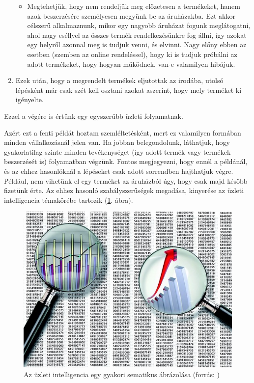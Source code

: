 \begin{enumerate}
\begin{itemize}
\item Megtehetjük, hogy nem rendeljük meg előzetesen a termékeket, hanem azok beszerzésére személyesen megyünk be az áruházakba. Ezt akkor célszerű alkalmaznunk, mikor egy nagyobb áruházat fogunk meglátogatni, ahol nagy eséllyel az összes termék rendelkezésünkre fog állni, így azokat egy helyről azonnal meg is tudjuk venni, és elvinni. Nagy előny ebben az esetben (szemben az online rendeléssel), hogy ki is tudjuk próbálni az adott termékeket, hogy hogyan működnek, van-e valamilyen hibájuk.
\end{itemize}

\item Ezek után, hogy a megrendelt termékek eljutottak az irodába, utolsó lépésként már csak szét kell osztani azokat aszerint, hogy mely terméket ki igényelte.
\end{enumerate}
Ezzel a végére is értünk egy egyszerűbb üzleti folyamatnak.

Azért ezt a fenti példát hoztam szemléltetésként, mert ez valamilyen formában minden vállalkozásnál jelen van. Ha jobban belegondolunk, láthatjuk, hogy gyakorlatilag szinte minden tevékenységet (így adott termék vagy termékek beszerzését is) folyamatban végzünk. Fontos megjegyezni, hogy ennél a példánál, és az ehhez hasonlóknál a lépéseket csak adott sorrendben hajthatjuk végre. Például, nem vihetünk el egy terméket az áruházból úgy, hogy csak majd később fizetünk érte. Az ehhez hasonló szabályszerűségek megadása, kinyerése az üzleti intelligencia témakörébe tartozik (\ref{fig:uzlint}. ábra).

\begin{figure}[h]
\centering
\includegraphics[scale=0.5]{images/uzleti_intelligencia.png}
\caption{Az üzleti intelligencia egy gyakori sematikus ábrázolása (forrás: \cite{piacp})}
\label{fig:uzlint}
\end{figure}

